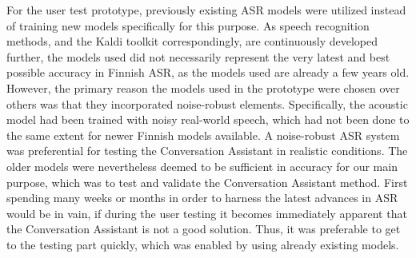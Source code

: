 \documentclass[english, 12pt, a4paper, pdftex, elec, utf8]{aaltothesis}
\begin{document}
For the user test prototype, previously existing ASR models were utilized instead of training new models specifically for this purpose. As speech recognition methods, and the Kaldi toolkit correspondingly, are continuously developed further, the models used did not necessarily represent the very latest and best possible accuracy in Finnish ASR, as the models used are already a few years old. However, the primary reason the models used in the prototype were chosen over others was that they incorporated noise-robust elements. Specifically, the acoustic model had been trained with noisy real-world speech, which had not been done to the same extent for newer Finnish models available. A noise-robust ASR system was preferential for testing the Conversation Assistant in realistic conditions. The older models were nevertheless deemed to be sufficient in accuracy for our main purpose, which was to test and validate the Conversation Assistant method. First spending many weeks or months in order to harness the latest advances in ASR would be in vain, if during the user testing it becomes immediately apparent that the Conversation Assistant is not a good solution. Thus, it was preferable to get to the testing part quickly, which was enabled by using already existing models. \\\\
\end{document}
